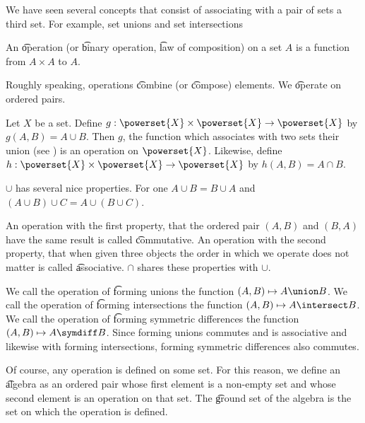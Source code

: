

We have seen several concepts that consist of associating with a pair of sets a third set.
For example, set unions and set intersections


An \t{operation} (or \t{binary operation}, \t{law of composition}) on a set $A$ is a function from $A \times A$ to $A$.

Roughly speaking, operations \t{combine} (or \t{compose}) elements.
We \t{operate} on ordered pairs.


Let $X$ be a set.
Define $g: \powerset{X} \times \powerset{X} \to \powerset{X}$ by $g(A, B) = A \cup B$.
Then $g$, the function which associates with two sets their union (see ) is an operation on $\powerset{X}$.
Likewise, define $h : \powerset{X} \times \powerset{X} \to \powerset{X}$ by $h(A, B) = A \cap B$.


$\cup$ has several nice properties.
For one $A \cup B = B \cup A$ and $(A \cup B) \cup C = A \cup (B \cup C)$.

An operation with the first property, that the ordered pair $(A, B)$ and $(B, A)$ have the same result is called \t{commutative}.
An operation with the second property, that when given three objects the order in which we operate does not matter is called \t{associative}.
$\cap$ shares these properties with $\cup$.

We call the operation of \t{forming unions} the function $(A, B) \mapsto A \union B$.
We call the operation of \t{forming intersections} the function $(A, B) \mapsto A \intersect B$.
We call the operation of \t{forming symmetric differences} the function $(A, B) \mapsto A \symdiff B$.
Since forming unions commutes and is associative and likewise with forming intersections, forming symmetric differences also commutes.


Of course, any operation is defined on some set.
For this reason, we define an \t{algebra} as an ordered pair whose first element is a non-empty set and whose second element is an operation on that set.
The \t{ground set} of the algebra is the set on which the operation is defined.
